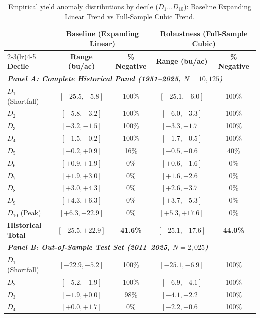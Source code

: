 \begin{table}[htbp]
\centering
\singlespacing
\footnotesize
\setlength{\tabcolsep}{4.5pt}
\caption{Empirical yield anomaly distributions by decile ($D_1 \dots D_{10}$): Baseline Expanding Linear Trend vs Full-Sample Cubic Trend.}
\label{tab:appendix_decile_distribution}
\begin{tabular}{l cc cc}
\toprule
& \multicolumn{2}{c}{\textbf{Baseline (Expanding Linear)}} & \multicolumn{2}{c}{\textbf{Robustness (Full-Sample Cubic)}} \\
\cmidrule(lr){2-3}\cmidrule(lr){4-5}
\textbf{Decile} & \textbf{Range (bu/ac)} & \textbf{\% Negative} & \textbf{Range (bu/ac)} & \textbf{\% Negative} \\
\midrule
\multicolumn{5}{l}{\textit{\textbf{Panel A: Complete Historical Panel (1951--2025, $N = 10{,}125$)}}} \\[0.5ex]
$D_{1}$ (Shortfall) & $[-25.5, -5.8]$ & 100\% & $[-25.1, -6.0]$ & 100\% \\
$D_{2}$ & $[-5.8, -3.2]$ & 100\% & $[-6.0, -3.3]$ & 100\% \\
$D_{3}$ & $[-3.2, -1.5]$ & 100\% & $[-3.3, -1.7]$ & 100\% \\
$D_{4}$ & $[-1.5, -0.2]$ & 100\% & $[-1.7, -0.5]$ & 100\% \\
$D_{5}$ & $[-0.2, +0.9]$ & 16\% & $[-0.5, +0.6]$ & 40\% \\
$D_{6}$ & $[+0.9, +1.9]$ & 0\% & $[+0.6, +1.6]$ & 0\% \\
$D_{7}$ & $[+1.9, +3.0]$ & 0\% & $[+1.6, +2.6]$ & 0\% \\
$D_{8}$ & $[+3.0, +4.3]$ & 0\% & $[+2.6, +3.7]$ & 0\% \\
$D_{9}$ & $[+4.3, +6.3]$ & 0\% & $[+3.7, +5.3]$ & 0\% \\
$D_{10}$ (Peak) & $[+6.3, +22.9]$ & 0\% & $[+5.3, +17.6]$ & 0\% \\
\midrule
\textbf{Historical Total} & $[-25.5, +22.9]$ & \textbf{41.6\%} & $[-25.1, +17.6]$ & \textbf{44.0\%} \\
\midrule
\multicolumn{5}{l}{\textit{\textbf{Panel B: Out-of-Sample Test Set (2011--2025, $N = 2{,}025$)}}} \\[0.5ex]
$D_{1}$ (Shortfall) & $[-22.9, -5.2]$ & 100\% & $[-25.1, -6.9]$ & 100\% \\
$D_{2}$ & $[-5.2, -1.9]$ & 100\% & $[-6.9, -4.1]$ & 100\% \\
$D_{3}$ & $[-1.9, +0.0]$ & 98\% & $[-4.1, -2.2]$ & 100\% \\
$D_{4}$ & $[+0.0, +1.7]$ & 0\% & $[-2.2, -0.6]$ & 100\% \\

\end{tabular}
\end{table}
